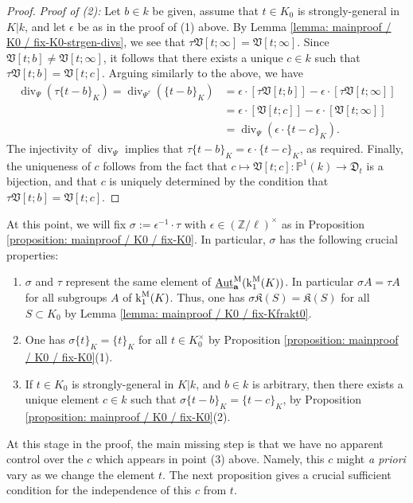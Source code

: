 \documentclass[11pt]{amsart}
\theoremstyle{definition}
\theoremstyle{remark}
\numberwithin{equation}{section}
\DeclareMathOperator{\Aut}{Aut}
\DeclareMathOperator{\divv}{div}
\newcommand{\Z}{\mathbb{Z}}
\newcommand{\Pbb}{\mathbb{P}}
\newcommand{\abf}{\mathbf{a}}
\newcommand{\Kfrak}{\mathfrak{K}}
\newcommand{\Dfrak}{\mathfrak{D}}
\newcommand{\Vfrak}{\mathfrak{V}}
\newcommand{\UAutm}{\underline{\Aut}^{\rm M}}
\renewcommand{\k}{\operatorname{k}^{\rm M}}
\begin{document}
\begin{proof}
  \vskip 5pt
  \noindent\emph{Proof of (2):} Let $b \in k$ be given, assume that $t \in K_0$ is strongly-general in $K|k$, and let $\epsilon$ be as in the proof of (1) above.
  By Lemma \ref{lemma: mainproof / K0 / fix-K0-strgen-divs}, we see that $\tau\Vfrak[t;\infty] = \Vfrak[t;\infty]$.
  Since $\Vfrak[t;b] \neq \Vfrak[t;\infty]$, it follows that there exists a unique $c \in k$ such that $\tau\Vfrak[t;b] = \Vfrak[t;c]$.
  Arguing similarly to the above, we have
  \begin{align*}
    \divv_{\Psi}(\tau\{t-b\}_K) = \divv_{\Psi^\tau}(\{t-b\}_K) &= \epsilon \cdot [\tau\Vfrak[t;b]] - \epsilon \cdot [\tau\Vfrak[t;\infty]] \\
                  &= \epsilon \cdot [\Vfrak[t;c]] - \epsilon \cdot [\Vfrak[t;\infty]] \\
                  &= \divv_\Psi(\epsilon \cdot \{t-c\}_K).
  \end{align*}
  The injectivity of $\divv_\Psi$ implies that $\tau\{t-b\}_K = \epsilon \cdot \{t-c\}_K$, as required.
  Finally, the uniqueness of $c$ follows from the fact that $c \mapsto \Vfrak[t;c] : \Pbb^1(k) \rightarrow \Dfrak_t$ is a bijection, and that $c$ is uniquely determined by the condition that $\tau\Vfrak[t;b] = \Vfrak[t;c]$.
\end{proof}

At this point, we will fix $\sigma := \epsilon^{-1} \cdot \tau$ with $\epsilon \in (\Z/\ell)^\times$ as in Proposition \ref{proposition: mainproof / K0 / fix-K0}.
In particular, $\sigma$ has the following crucial properties:
\begin{enumerate}
  \item $\sigma$ and $\tau$ represent the same element of $\UAutm_\abf(\k_1(K))$.
  In particular $\sigma A = \tau A$ for all subgroups $A$ of $\k_1(K)$.
  Thus, one has $\sigma\Kfrak(S) = \Kfrak(S)$ for all $S \subset K_0$ by Lemma \ref{lemma: mainproof / K0 / fix-Kfrakt0}.
  \item One has $\sigma\{t\}_K = \{t\}_K$ for all $t \in K_0^\times$ by Proposition \ref{proposition: mainproof / K0 / fix-K0}(1).
  \item If $t \in K_0$ is strongly-general in $K|k$, and $b \in k$ is arbitrary, then there exists a unique element $c \in k$ such that $\sigma\{t-b\}_K = \{t-c\}_K$, by Proposition \ref{proposition: mainproof / K0 / fix-K0}(2).
\end{enumerate}

At this stage in the proof, the main missing step is that we have no apparent control over the $c$ which appears in point (3) above.
Namely, this $c$ might \emph{a priori} vary as we change the element $t$.
The next proposition gives a crucial sufficient condition for the independence of this $c$ from $t$.
\end{document}
